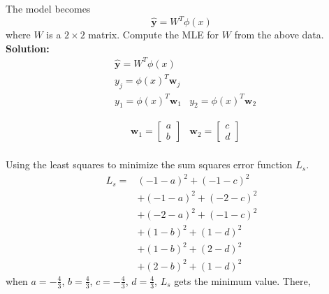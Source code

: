 \documentclass{article}
\begin{document}
The model becomes 
\begin{equation}
    \hat{\mathbf{y}} = W^{T}\phi(x)
\end{equation}
where $W$ is a $2\times2$ matrix. Compute the MLE for $W$ from the above data. \\
\textbf{Solution:} \\
\begin{equation}
\begin{aligned}
& \hat{\mathbf{y}} = W^{T}\phi(x) \\
& y_{j} = \phi(x)^{T}\mathbf{w}_{j} \\
& y_1 = \phi(x)^{T} \mathbf{w}_1 
& y_2 = \phi(x)^{T} \mathbf{w}_2
\end{aligned}
\end{equation}

\begin{equation}
\begin{aligned}
&\mathbf{w}_1  = \left[\begin{array}{c}  a \\  b \end{array} \right] 
&\mathbf{w}_2 = \left[\begin{array}{c}  c \\  d \end{array} \right] 
\end{aligned}
\end{equation}
\\
Using the least squares to minimize the sum squares error function $L_{s}$.
\begin{equation}
\begin{aligned}
L_s = & (-1-a)^2+(-1-c)^2 \\
     & + (-1-a)^2+(-2-c)^2 \\
     & + (-2-a)^2+(-1-c)^2 \\
     & + (1-b)^2+(1-d)^2 \\
     & +(1-b)^2 + (2-d)^2 \\
     & +(2-b)^2 + (1-d)^2
\end{aligned}
\end{equation}
when $a=-\frac{4}{3}$, $b=\frac{4}{3}$, $c=-\frac{4}{3}$, $d=\frac{4}{3}$, $L_s$ gets the minimum value.
There,
\end{document}
